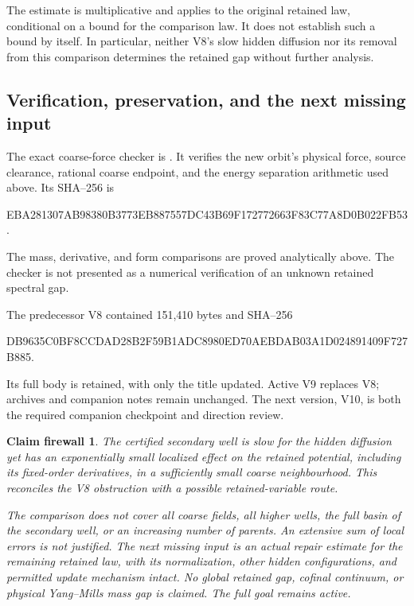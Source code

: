 \documentclass[11pt,oneside]{article}
\newtheorem{firewall}[theorem]{Claim firewall}
\begin{document}
The estimate is multiplicative and
applies to the original retained
law, conditional on a bound for
the comparison law. It does not
establish such a bound by itself.
In particular, neither V8's slow
hidden diffusion nor its removal
from this comparison determines
the retained gap without further
analysis.

\subsection{Verification, preservation, and the next missing input}

The exact coarse-force checker is
.
It verifies the new orbit's physical
force, source clearance, rational
coarse endpoint, and the energy
separation arithmetic used above.
Its SHA--256 is
\begin{center}\scriptsize\ttfamily
EBA281307AB98380B3773EB887557DC43B69F172772663F83C77A8D0B022FB53.
\end{center}
The mass, derivative, and form
comparisons are proved analytically
above. The checker is not presented
as a numerical verification of an
unknown retained spectral gap.

The predecessor V8 contained
151,410 bytes and SHA--256
\begin{center}\scriptsize\ttfamily
DB9635C0BF8CCDAD28B2F59B1ADC8980ED70AEBDAB03A1D024891409F727B885.
\end{center}
Its full body is retained, with
only the title updated. Active V9
replaces V8; archives and companion
notes remain unchanged. The next
version, V10, is both the required
companion checkpoint and direction
review.

\begin{firewall}
The certified secondary well is
slow for the hidden diffusion yet
has an exponentially small localized
effect on the retained potential,
including its fixed-order derivatives,
in a sufficiently small coarse
neighbourhood. This reconciles the
V8 obstruction with a possible
retained-variable route.

The comparison does not cover all
coarse fields, all higher wells,
the full basin of the secondary
well, or an increasing number of
parents. An extensive sum of local
errors is not justified. The next
missing input is an actual repair
estimate for the remaining retained
law, with its normalization, other
hidden configurations, and permitted
update mechanism intact. No global
retained gap, cofinal continuum, or
physical Yang--Mills mass gap is
claimed. The full goal remains active.
\end{firewall}
\end{document}
